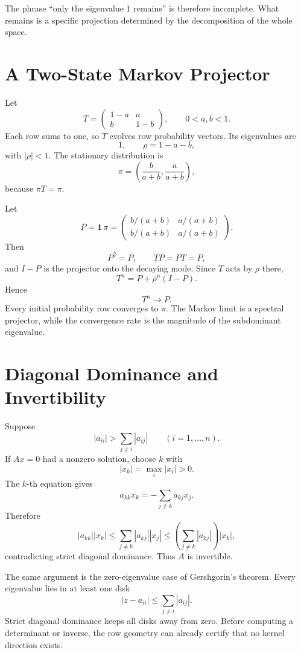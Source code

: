 The phrase “only the eigenvalue \(1\) remains” is therefore incomplete.  What remains is a specific projection determined by the decomposition of the whole space.

\section{A Two-State Markov Projector}

Let
\[
  T=
  \begin{pmatrix}
    1-a&a\\
    b&1-b
  \end{pmatrix},
  \qquad
  0<a,b<1.
\]
Each row sums to one, so \(T\) evolves row probability vectors.  Its eigenvalues are
\[
  1,
  \qquad
  \rho=1-a-b,
\]
with \(|\rho|<1\).  The stationary distribution is
\[
  \pi=
  \left(
  \frac{b}{a+b},
  \frac{a}{a+b}
  \right),
\]
because \(\pi T=\pi\).

Let
\[
  P=\mathbf1\,\pi
  =
  \begin{pmatrix}
    b/(a+b)&a/(a+b)\\
    b/(a+b)&a/(a+b)
  \end{pmatrix}.
\]
Then
\[
  P^2=P,
  \qquad
  TP=PT=P,
\]
and \(I-P\) is the projector onto the decaying mode.  Since \(T\) acts by \(\rho\) there,
\[
  \boxed{
  T^n=P+\rho^n(I-P).}
\]
Hence
\[
  T^n\longrightarrow P.
\]
Every initial probability row converges to \(\pi\).  The Markov limit is a spectral projector, while the convergence rate is the magnitude of the subdominant eigenvalue.

\section{Diagonal Dominance and Invertibility}

Suppose
\[
  |a_{ii}|>
  \sum_{j\ne i}|a_{ij}|
  \qquad(i=1,\ldots,n).
\]
If \(Ax=0\) had a nonzero solution, choose \(k\) with
\[
  |x_k|=\max_i|x_i|>0.
\]
The \(k\)-th equation gives
\[
  a_{kk}x_k=-\sum_{j\ne k}a_{kj}x_j.
\]
Therefore
\[
  |a_{kk}||x_k|
  \le
  \sum_{j\ne k}|a_{kj}||x_j|
  \le
  \left(\sum_{j\ne k}|a_{kj}|\right)|x_k|,
\]
contradicting strict diagonal dominance.  Thus \(A\) is invertible.

The same argument is the zero-eigenvalue case of Gershgorin's theorem.  Every eigenvalue lies in at least one disk
\[
  |z-a_{ii}|\le\sum_{j\ne i}|a_{ij}|.
\]
Strict diagonal dominance keeps all disks away from zero.  Before computing a determinant or inverse, the row geometry can already certify that no kernel direction exists.

